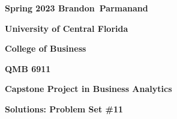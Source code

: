 

\pagestyle{empty}
{\noindent\bf Spring 2023 \hfill Brandon~Parmanand}
\vskip 16pt
\centerline{\bf University of Central Florida}
\centerline{\bf College of Business}
\vskip 16pt
\centerline{\bf QMB 6911}
\centerline{\bf Capstone Project in Business Analytics}
\vskip 10pt
\centerline{\bf Solutions:  Problem Set \#11}
\vskip 32pt
\noindent

